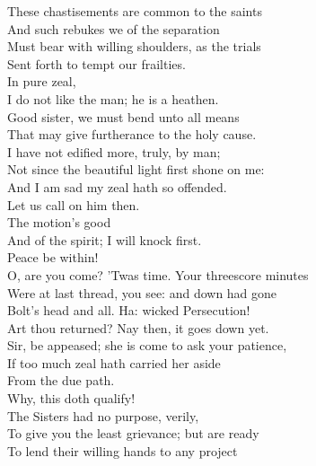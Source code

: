 \documentclass[a4paper,oneside,12pt]{memoir}
\begin{document}
\begin{drama*}
\tribulationspeaks These chastisements are common to the saints\\
And such rebukes we of the separation\\
Must bear with willing shoulders, as the trials\\
Sent forth to tempt our frailties.\\
\persecutionspeaks {} In pure zeal,\\
I do not like the man; he is a heathen.\\
\tribulationspeaks Good sister, we must bend unto all means\\
That may give furtherance to the holy cause.\\
\persecutionspeaks I have not edified more, truly, by man;\\
Not since the beautiful light first shone on me:\\
And I am sad my zeal hath so offended.\\
\tribulationspeaks Let us call on him then.\\
\persecutionspeaks {} The motion's good\\
And of the spirit; I will knock first.\\
 Peace be within!\\
\subtlespeaks O, are you come? 'Twas time. Your threescore minutes\\
Were at last thread, you see: and down had gone\\
Bolt's head and all. Ha: wicked Persecution!\\
Art thou returned? Nay then, it goes down yet.\\
\tribulationspeaks Sir, be appeased; she is come to ask your patience,\\
If too much zeal hath carried her aside\\
From the due path.\\
\subtlespeaks {} Why, this doth qualify!\\
\tribulationspeaks The Sisters had no purpose, verily,\\
To give you the least grievance; but are ready\\
To lend their willing hands to any project\\

\end{drama*}
\end{document}
